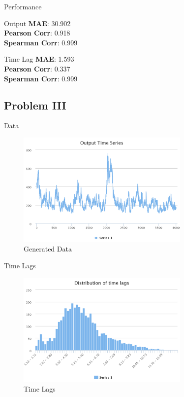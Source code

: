 \documentclass{beamer}
\begin{document}
\begin{frame}{Performance}
 
\begin{block}{Output}
\textbf{MAE}: 30.902 \\
\textbf{Pearson Corr}: 0.918 \\
\textbf{Spearman Corr}: 0.999
\end{block}

\begin{block}{Time Lag}
\textbf{MAE}: 1.593 \\
\textbf{Pearson Corr}: 0.337 \\
\textbf{Spearman Corr}: 0.999
\end{block}



\end{frame}

\subsection{Problem III}

\begin{frame}{Data}
    \begin{figure}[h]
        \includegraphics[width=0.75\textwidth]{timeseries-problem-iii.png}
        \caption{Generated Data}
        \label{fig:TimeSeries-iii}
      \end{figure}
\end{frame}

\begin{frame}{Time Lags}
    \begin{figure}[h]
        \includegraphics[width=0.75\textwidth]{data-hist-problem-iii.png}
        \caption{Time Lags}
        \label{fig:TimeLags-iii}
      \end{figure}
\end{frame}
\end{document}
